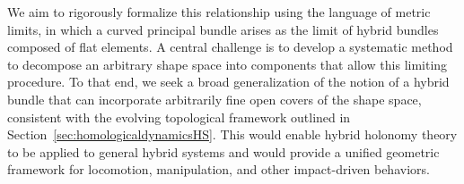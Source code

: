\documentclass[letterpaper,11pt]{article}
\begin{document}
We aim to rigorously formalize this relationship using the language of metric limits, in which a curved principal bundle arises as the limit of hybrid bundles composed of flat elements. 
A central challenge is to develop a systematic method to decompose an arbitrary shape space into components that allow this limiting procedure. 
To that end, we seek a broad generalization of the notion of a hybrid bundle that can incorporate arbitrarily fine open covers of the shape space, consistent with the evolving topological framework outlined in Section~\ref{sec:homologicaldynamicsHS}.
This would enable hybrid holonomy theory to be applied to general hybrid systems and would provide a unified geometric framework for locomotion, manipulation, and other impact-driven behaviors.




\end{document}
